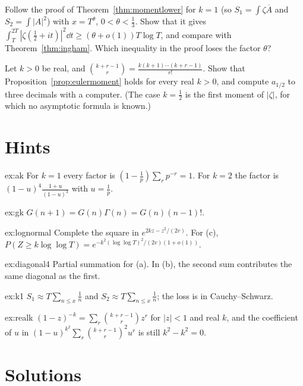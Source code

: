 \begin{exercise}[$\star$]\label{ex:k1}
Follow the proof of Theorem~\ref{thm:momentlower} for $k=1$ (so $S_1=\int\zeta\overline A$ and $S_2=\int|A|^2$) with $x=T^\theta$, $0<\theta<\frac13$. Show that it gives $\int_T^{2T}|\zeta(\frac12+it)|^2\dd t\ge(\theta+o(1))T\log T$, and compare with Theorem~\ref{thm:ingham}. Which inequality in the proof loses the factor $\theta$?
\end{exercise}

\begin{exercise}[$\star\star\star$]\label{ex:realk}
Let $k>0$ be real, and $\binom{k+r-1}r=\frac{k(k+1)\cdots(k+r-1)}{r!}$. Show that Proposition~\ref{prop:eulermoment} holds for every real $k>0$, and compute $a_{1/2}$ to three decimals with a computer. (The case $k=\frac12$ is the first moment of $|\zeta|$, for which no asymptotic formula is known.)
\end{exercise}

\section{Hints}

\begin{hint}{ex:ak}
For $k=1$ every factor is $(1-\frac1p)\sum_rp^{-r}=1$. For $k=2$ the factor is $(1-u)^4\frac{1+u}{(1-u)^3}$ with $u=\frac1p$.
\end{hint}
\begin{hint}{ex:gk}
$G(n+1)=G(n)\Gamma(n)=G(n)(n-1)!$.
\end{hint}
\begin{hint}{ex:lognormal}
Complete the square in $e^{2kz-z^2/(2v)}$. For (c), $P(Z\ge k\log\log T)=e^{-k^2(\log\log T)^2/(2v)(1+o(1))}$.
\end{hint}
\begin{hint}{ex:diagonal4}
Partial summation for (a). In (b), the second sum contributes the same diagonal as the first.
\end{hint}
\begin{hint}{ex:k1}
$S_1\approx T\sum_{n\le x}\frac1n$ and $S_2\approx T\sum_{n\le x}\frac1n$; the loss is in Cauchy--Schwarz.
\end{hint}
\begin{hint}{ex:realk}
$(1-z)^{-k}=\sum_r\binom{k+r-1}rz^r$ for $|z|<1$ and real $k$, and the coefficient of $u$ in $(1-u)^{k^2}\sum_r\binom{k+r-1}r^2u^r$ is still $k^2-k^2=0$.
\end{hint}

\section{Solutions}

